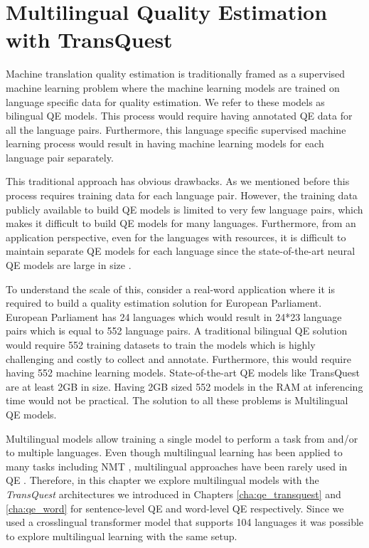 \newcommand\figlength{6cm}

\chapter{\label{cha:qe_multilingual}Multilingual Quality Estimation with TransQuest}

Machine translation quality estimation is traditionally framed as a supervised machine learning problem \autocite{kepler-etal-2019-openkiwi,lee-2020-two} where the machine learning models are trained on language specific data for quality estimation. We refer to these models as bilingual QE models. This process would require having annotated QE data for all the language pairs. Furthermore, this language specific supervised machine learning process would result in having machine learning models for each language pair separately. 

This traditional approach has obvious drawbacks. As we mentioned before this process requires training data for each language pair. However, the training data publicly available to build QE models is limited to very few language pairs, which makes it difficult to build QE models for many languages. Furthermore, from an application perspective, even for the languages with resources, it is difficult to maintain separate QE models for each language since the state-of-the-art neural QE models are large in size \autocite{ranasinghe-etal-2020-transquest}. 

To understand the scale of this, consider a real-word application where it is required to build a quality estimation solution for European Parliament. European Parliament has 24 languages which would result in 24*23 language pairs which is equal to 552 language pairs. A traditional bilingual QE solution would require 552 training datasets to train the models which is highly challenging and costly to collect and annotate. Furthermore, this would require having 552 machine learning models. State-of-the-art QE models like TransQuest are at least 2GB in size. Having 2GB sized 552 models in the RAM at inferencing time would not be practical. The solution to all these problems is Multilingual QE models. 

Multilingual models allow training a single model to perform a task from and/or to multiple languages. Even though multilingual learning has been applied to many tasks \autocite{ranasinghe-zampieri-2020-multilingual,ranasinghe-zampieri-2021-mudes} including NMT \autocite{nguyen-chiang-2017-transfer, aharoni-etal-2019-massively}, multilingual approaches have been rarely used in QE \autocite{sun-etal-2020-exploratory}. Therefore, in this chapter we explore multilingual models with the \textit{TransQuest} architectures we introduced in Chapters \ref{cha:qe_transquest} and \ref{cha:qe_word} for sentence-level QE and word-level QE respectively. Since we used a crosslingual transformer model that supports 104 languages \autocite{conneau-etal-2020-unsupervised} it was possible to explore multilingual learning with the same setup.


